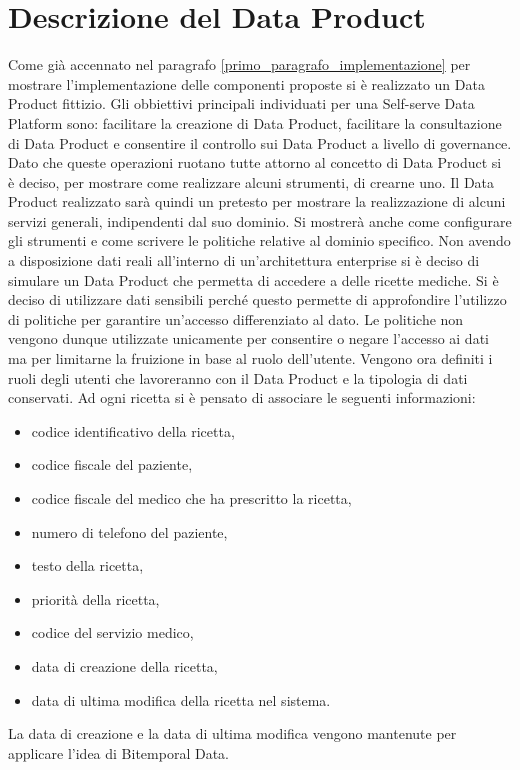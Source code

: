 \documentclass[12pt]{report}
\begin{document}
\section{Descrizione del Data Product}\label{caratteristicheDP}
Come già accennato nel paragrafo \ref{primo_paragrafo_implementazione} per mostrare l'implementazione delle componenti proposte si è realizzato un Data Product fittizio.
Gli obbiettivi principali individuati per una Self-serve Data Platform sono: facilitare la creazione di Data Product, facilitare la consultazione di Data Product e consentire il controllo sui Data Product a livello di governance. 
Dato che queste operazioni ruotano tutte attorno al concetto di Data Product si è deciso, per mostrare come realizzare alcuni strumenti, di crearne uno.
Il Data Product realizzato sarà quindi un pretesto per mostrare la realizzazione di alcuni servizi generali, indipendenti dal suo dominio.
Si mostrerà anche come configurare gli strumenti e come scrivere le politiche relative al dominio specifico. 
Non avendo a disposizione dati reali all'interno di un'architettura enterprise si è deciso di simulare un Data Product che permetta di accedere a delle ricette mediche. 
Si è deciso di utilizzare dati sensibili perché questo permette di approfondire l'utilizzo di politiche per garantire un'accesso differenziato al dato.
Le politiche non vengono dunque utilizzate unicamente per consentire o negare l'accesso ai dati ma per limitarne la fruizione in base al ruolo dell'utente. 
Vengono ora definiti i ruoli degli utenti che lavoreranno con il Data Product e la tipologia di dati conservati.  
Ad ogni ricetta si è pensato di associare le seguenti informazioni:\begin{itemize}
    \item codice identificativo della ricetta,
    \item codice fiscale del paziente,
    \item codice fiscale del medico che ha prescritto la ricetta,
    \item numero di telefono del paziente,
    \item testo della ricetta,
    \item priorità della ricetta,
    \item codice del servizio medico,
    \item data di creazione della ricetta,
    \item data di ultima modifica della ricetta nel sistema. 
\end{itemize}
La data di creazione e la data di ultima modifica vengono mantenute per applicare l'idea di Bitemporal Data.
\end{document}
